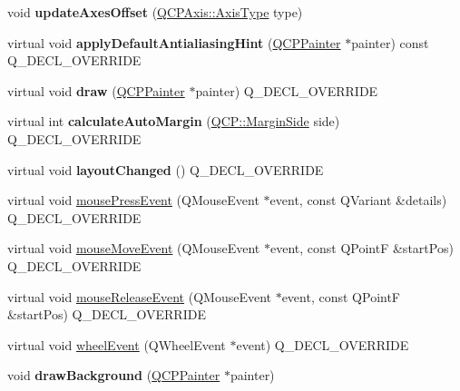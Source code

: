 \begin{DoxyCompactItemize}
\item 
void {\bfseries update\+Axes\+Offset} (\hyperlink{class_q_c_p_axis_ae2bcc1728b382f10f064612b368bc18a}{Q\+C\+P\+Axis\+::\+Axis\+Type} type)\hypertarget{class_q_c_p_axis_rect_a6024ccdc74f5dc0e8a0fe482e5b28a20}{}\label{class_q_c_p_axis_rect_a6024ccdc74f5dc0e8a0fe482e5b28a20}

\item 
virtual void {\bfseries apply\+Default\+Antialiasing\+Hint} (\hyperlink{class_q_c_p_painter}{Q\+C\+P\+Painter} $\ast$painter) const Q\+\_\+\+D\+E\+C\+L\+\_\+\+O\+V\+E\+R\+R\+I\+DE\hypertarget{class_q_c_p_axis_rect_a3b22bd6e457a8aa80862d8a1028176fd}{}\label{class_q_c_p_axis_rect_a3b22bd6e457a8aa80862d8a1028176fd}

\item 
virtual void {\bfseries draw} (\hyperlink{class_q_c_p_painter}{Q\+C\+P\+Painter} $\ast$painter) Q\+\_\+\+D\+E\+C\+L\+\_\+\+O\+V\+E\+R\+R\+I\+DE\hypertarget{class_q_c_p_axis_rect_ab2b26ea1267ef842b20a05569577487b}{}\label{class_q_c_p_axis_rect_ab2b26ea1267ef842b20a05569577487b}

\item 
virtual int {\bfseries calculate\+Auto\+Margin} (\hyperlink{namespace_q_c_p_a7e487e3e2ccb62ab7771065bab7cae54}{Q\+C\+P\+::\+Margin\+Side} side) Q\+\_\+\+D\+E\+C\+L\+\_\+\+O\+V\+E\+R\+R\+I\+DE\hypertarget{class_q_c_p_axis_rect_a986b1199b2827a5def15f986711b7c0e}{}\label{class_q_c_p_axis_rect_a986b1199b2827a5def15f986711b7c0e}

\item 
virtual void {\bfseries layout\+Changed} () Q\+\_\+\+D\+E\+C\+L\+\_\+\+O\+V\+E\+R\+R\+I\+DE\hypertarget{class_q_c_p_axis_rect_a218b0d8e065b7eb5fc23c0d80e7d5f33}{}\label{class_q_c_p_axis_rect_a218b0d8e065b7eb5fc23c0d80e7d5f33}

\item 
virtual void \hyperlink{class_q_c_p_axis_rect_a8f514245839c0bfd9472e945899064e7}{mouse\+Press\+Event} (Q\+Mouse\+Event $\ast$event, const Q\+Variant \&details) Q\+\_\+\+D\+E\+C\+L\+\_\+\+O\+V\+E\+R\+R\+I\+DE
\item 
virtual void \hyperlink{class_q_c_p_axis_rect_a96e89068c5d9859f777d269fc277667a}{mouse\+Move\+Event} (Q\+Mouse\+Event $\ast$event, const Q\+PointF \&start\+Pos) Q\+\_\+\+D\+E\+C\+L\+\_\+\+O\+V\+E\+R\+R\+I\+DE
\item 
virtual void \hyperlink{class_q_c_p_axis_rect_ae4d536756ccd48928e8b3c475d8384b1}{mouse\+Release\+Event} (Q\+Mouse\+Event $\ast$event, const Q\+PointF \&start\+Pos) Q\+\_\+\+D\+E\+C\+L\+\_\+\+O\+V\+E\+R\+R\+I\+DE
\item 
virtual void \hyperlink{class_q_c_p_axis_rect_a2ca1c7bf10a472147df1b7d7bc6bfe93}{wheel\+Event} (Q\+Wheel\+Event $\ast$event) Q\+\_\+\+D\+E\+C\+L\+\_\+\+O\+V\+E\+R\+R\+I\+DE
\item 
void {\bfseries draw\+Background} (\hyperlink{class_q_c_p_painter}{Q\+C\+P\+Painter} $\ast$painter)\hypertarget{class_q_c_p_axis_rect_ab49d338d1ce74b476fcead5b32cf06dc}{}\label{class_q_c_p_axis_rect_ab49d338d1ce74b476fcead5b32cf06dc}


\end{DoxyCompactItemize}
